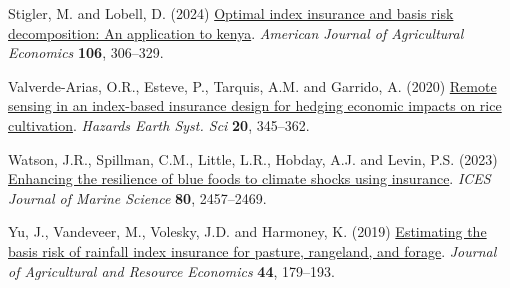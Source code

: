 \documentclass[
  letterpaper,
  DIV=11,
  numbers=noendperiod]{scrartcl}
\newlength{\cslhangindent}
\newlength{\cslentryspacingunit} %
\newenvironment{CSLReferences}[2] %
 {%
  \setlength{\parindent}{0pt}
  \ifodd #1
  \let\oldpar\par
  \def\par{\hangindent=\cslhangindent\oldpar}
  \fi
  \setlength{\parskip}{#2\cslentryspacingunit}
 }%
 {}
\begin{document}
\begin{CSLReferences}{1}{0}
\leavevmode{}%
Stigler, M. and Lobell, D. (2024)
\href{https://doi.org/10.1111/ajae.12375}{Optimal index insurance and
basis risk decomposition: An application to kenya}. \emph{American
Journal of Agricultural Economics} \textbf{106}, 306--329.

\leavevmode{}%
Valverde-Arias, O.R., Esteve, P., Tarquis, A.M. and Garrido, A. (2020)
\href{https://doi.org/10.5194/nhess-20-345-2020}{Remote sensing in an
index-based insurance design for hedging economic impacts on rice
cultivation}. \emph{Hazards Earth Syst. Sci} \textbf{20}, 345--362.

\leavevmode{}%
Watson, J.R., Spillman, C.M., Little, L.R., Hobday, A.J. and Levin, P.S.
(2023) \href{https://doi.org/10.1093/icesjms/fsad175}{Enhancing the
resilience of blue foods to climate shocks using insurance}. \emph{ICES
Journal of Marine Science} \textbf{80}, 2457--2469.

\leavevmode{}%
Yu, J., Vandeveer, M., Volesky, J.D. and Harmoney, K. (2019)
\href{https://doi.org/10.22004/ag.econ.281319}{Estimating the basis risk
of rainfall index insurance for pasture, rangeland, and forage}.
\emph{Journal of Agricultural and Resource Economics} \textbf{44},
179--193.

\end{CSLReferences}
\end{document}
